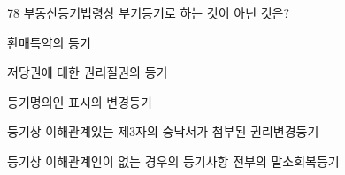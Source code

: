 \begin{question}{78}
부동산등기법령상 부기등기로 하는 것이 아닌 것은?
\begin{choices}
  \item 환매특약의 등기
  \item 저당권에 대한 권리질권의 등기
  \item 등기명의인 표시의 변경등기
  \item 등기상 이해관계있는 제3자의 승낙서가 첨부된 권리변경등기
  \item 등기상 이해관계인이 없는 경우의 등기사항 전부의 말소회복등기
\end{choices}
\end{question}
